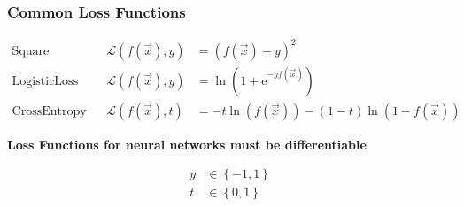 \begin{frame}
    \frametitle{Common Loss Functions}
    \begin{center}
    
    \begin{align*}
    \mathrm{Square} & &  \mathcal{L}(f(\vec{x}), y) &= \left(f(\vec{x}) - y\right)^2 \\
    \mathrm{Logistic Loss} & & \mathcal{L}(f(\vec{x}), y) &= \ln \left(1 + \mathrm{e}^{-y f(\vec{x})} \right) \\
    \mathrm{Cross Entropy} & &  \mathcal{L}(f(\vec{x}), t) &= -t \ln \left(f(\vec{x}) \right) - (1-t) \ln \left( 1 - f(\vec{x}) \right)
    \end{align*}
    
    \textbf{Loss Functions for neural networks must be differentiable}
    
     \end{center}
        
    \vspace{2em}
    \begin{small}
       \begin{align*}
       y &\in \left\lbrace -1, 1\right\rbrace \\
       t &\in \left\lbrace 0, 1 \right\rbrace
       \end{align*} 
    \end{small}
\end{frame}

